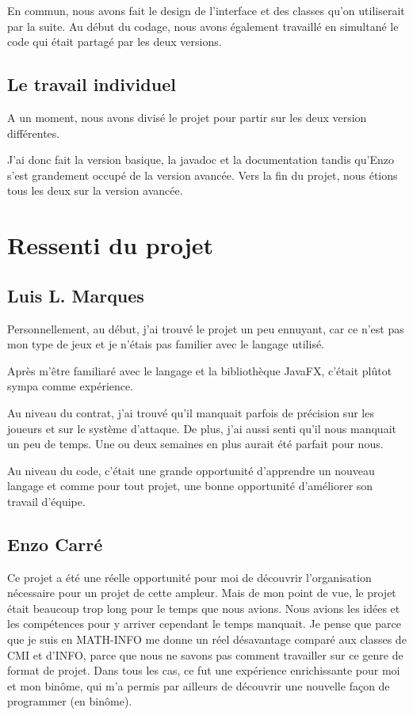 \documentclass[12pt, a4paper]{report}
\begin{document}
En commun, nous avons fait le design de l'interface et des classes qu'on utiliserait par la suite. Au début du codage, nous avons également travaillé en simultané le code qui était partagé par les deux versions.

\subsection*{Le travail individuel}

A un moment, nous avons divisé le projet pour partir sur les deux version différentes.

J'ai donc fait la version basique, la javadoc et la documentation tandis qu'Enzo s'est grandement occupé de la version avancée. Vers la fin du projet, nous étions tous les deux sur la version avancée.

\section*{Ressenti du projet}

\subsection*{Luis L. Marques}

Personnellement, au début, j'ai trouvé le projet un peu ennuyant, car ce n'est pas mon type de jeux et je n'étais pas familier avec le langage utilisé.

Après m'être familiaré avec le langage et la bibliothèque JavaFX, c'était plûtot sympa comme expérience.

Au niveau du contrat, j'ai trouvé qu'il manquait parfois de précision sur les joueurs et sur le système d'attaque. De plus, j'ai aussi senti qu'il nous manquait un peu de temps. Une ou deux semaines en plus aurait été parfait pour nous.

Au niveau du code, c'était une grande opportunité d'apprendre un nouveau langage et comme pour tout projet, une bonne opportunité d'améliorer son travail d'équipe.

\subsection*{Enzo Carré}

Ce projet a été une réelle opportunité pour moi de découvrir l’organisation nécessaire pour un projet de cette ampleur. Mais de mon point de vue, le projet était beaucoup trop long pour le temps que nous avions. Nous avions les idées et les compétences pour y arriver cependant le temps manquait. Je pense que parce que je suis en MATH-INFO me donne un réel désavantage comparé aux classes de CMI et d’INFO, parce que nous ne savons pas comment travailler sur ce genre de format de projet. Dans tous les cas, ce fut une expérience enrichissante pour moi et mon binôme, qui m’a permis par ailleurs de découvrir une nouvelle façon de programmer (en binôme).
\end{document}
